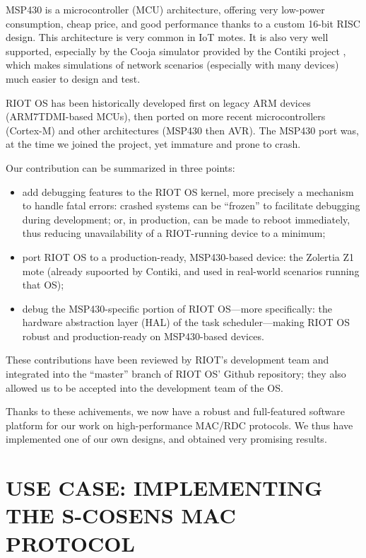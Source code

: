 \documentclass[a4paper,twoside]{article}
\begin{document}
MSP430 is a microcontroller (MCU) architecture, offering very low-power
consumption, cheap price, and good performance thanks to a custom 16-bit
RISC design. This architecture is very common in IoT motes.
It is also very well supported, especially by the Cooja simulator
provided by the Contiki project \cite{Cooja}, which makes simulations
of network scenarios (especially with many devices) much easier
to design and test.

RIOT OS has been historically developed first on legacy ARM devices
(ARM7TDMI-based MCUs), then ported on more recent microcontrollers
(Cortex-M) and other architectures (MSP430 then AVR).
The MSP430 port was, at the time we joined the project, yet immature
and prone to crash.

Our contribution can be summarized in three points:

\begin{itemize}

\item add debugging features to the RIOT OS kernel, more precisely
      a mechanism to handle fatal errors: crashed systems can be
      ``frozen'' to facilitate debugging during development; or,
      in production, can be made to reboot immediately, thus reducing
      unavailability of a RIOT-running device to a minimum;

\item port RIOT OS to a production-ready, MSP430-based device:
      the Zolertia Z1 mote (already supoorted by Contiki,
      and used in real-world scenarios running that OS);

\item debug the MSP430-specific portion of RIOT OS---more specifically:
      the hardware abstraction layer (HAL) of the task scheduler---making
      RIOT OS robust and production-ready on MSP430-based devices.

\end{itemize}

These contributions have been reviewed by RIOT's development team
and integrated into the ``master'' branch of RIOT OS' Github repository;
they also allowed us to be accepted into the development team of the OS.

Thanks to these achivements, we now have a robust and full-featured
software platform for our work on high-performance MAC/RDC protocols.
We thus have implemented one of our own designs, and obtained very
promising results.


\section{\uppercase{Use Case: implementing the S-CoSenS MAC protocol}}
\end{document}
